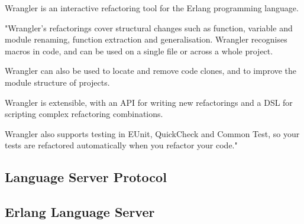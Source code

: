 Wrangler is an interactive refactoring tool for the Erlang programming language.

"Wrangler’s refactorings cover structural changes such as function, variable and module renaming, function extraction and generalisation. Wrangler recognises macros in code, and can be used on a single file or across a whole project.

Wrangler can also be used to locate and remove code clones, and to improve the module structure of projects.

Wrangler is extensible, with an API for writing new refactorings and a DSL for scripting complex refactoring combinations.

Wrangler also supports testing in EUnit, QuickCheck and Common Test, so your tests are refactored automatically when you refactor your code." \cite{WranglerHome}

\subsection{Language Server Protocol}


\subsection{Erlang Language Server}




